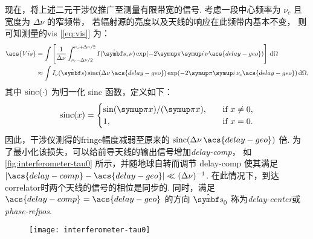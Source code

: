 现在，将上述二元干涉仪推广至测量有限带宽的信号.
考虑一段中心频率为 $\nu_c$ 且宽度为 $\Delta\nu$ 的窄频带，
若辐射源的亮度以及天线的响应在此频带内基本不变，
则可知测量的\ac{vis} [\autoref{eq:vis}] 为：
\begin{align}
  \acs{Vis} &= \int \left[ \frac{1}{\Delta\nu}
        \int_{\nu_c-\Delta\nu/2}^{\nu_c+\Delta\nu/2}
        I(\hat{\B{s}}, \nu) \exp (-2\Cpi\Ci\, \nu\acs{delay-geo})
      \right] \,\D{\Omega} \\
    &\approx \int I_{\nu}(\hat{\B{s}}) \sinc (\Delta\nu\,\acs{delay-geo})
      \exp (-2\Cpi\Ci\, \nu_c\acs{delay-geo}) \,\D{\Omega},
  \label{eq:vis-bw}
\end{align}
其中 $\operatorname{sinc}(\cdot)$ 为归一化 sinc 函数，定义如下：
\begin{equation}
  \label{eq:sinc}
  \sinc(x) =
    \begin{cases}
      \sin(\Cpi x) / (\Cpi x), & \quad \text{if } x \neq 0, \\
      1, & \quad \text{if } x = 0.
    \end{cases}
\end{equation}
因此，干涉仪测得的\ac{fringe}幅度减弱至原来的
$\sinc(\Delta\nu\,\acs{delay-geo})$ 倍.
为了最小化该损失，可以给前导天线的输出信号增加\emph{\acf{delay-comp}}，
如\autoref{fig:interferometer-tau0} 所示，并随地球自转而调节 \acs{delay-comp}
使其满足 $|\acs{delay-comp} - \acs{delay-geo}| \ll (\Delta\nu)^{-1}$.
在此情况下，到达\ac{correlator}时两个天线的信号的相位是同步的.
同时，满足 $\acs{delay-comp} = \acs{delay-geo}$ 的方向 $\hat{\B{s}}_0$
称为\emph{\acf{delay-center}}或\emph{\acf{phase-refpos}}.

\begin{figure}[htp]
  \centering
  \texttt{[image: interferometer-tau0]}
  \label{fig:interferometer-tau0}
\end{figure}


